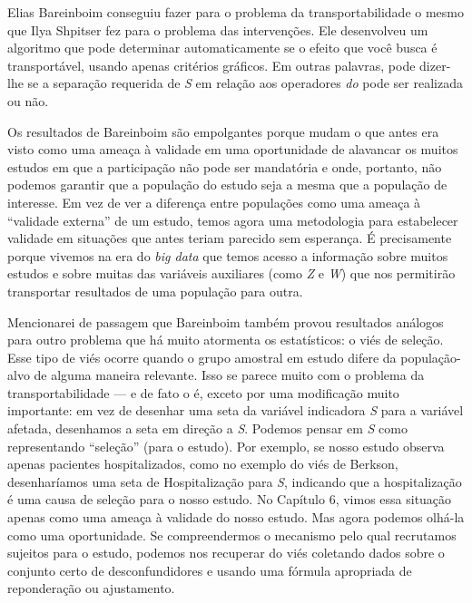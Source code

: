 \documentclass[11pt,a5paper,twoside]{book}
\begin{document}
Elias Bareinboim conseguiu fazer para o problema da transportabilidade o mesmo que Ilya Shpitser fez para o problema das intervenções. Ele desenvolveu um algoritmo que pode determinar automaticamente se o efeito que você busca é transportável, usando apenas critérios gráficos. Em outras palavras, pode dizer-lhe se a separação requerida de \textit{S} em relação aos operadores \textit{do} pode ser realizada ou não.

Os resultados de Bareinboim são empolgantes porque mudam o que antes era visto como uma ameaça à validade em uma oportunidade de alavancar os muitos estudos em que a participação não pode ser mandatória e onde, portanto, não podemos garantir que a população do estudo seja a mesma que a população de interesse. Em vez de ver a diferença entre populações como uma ameaça à “validade externa” de um estudo, temos agora uma metodologia para estabelecer validade em situações que antes teriam parecido sem esperança. É precisamente porque vivemos na era do \textit{big data} que temos acesso a informação sobre muitos estudos e sobre muitas das variáveis auxiliares (como \textit{Z} e \textit{W}) que nos permitirão transportar resultados de uma população para outra.

Mencionarei de passagem que Bareinboim também provou resultados análogos para outro problema que há muito atormenta os estatísticos: o viés de seleção. Esse tipo de viés ocorre quando o grupo amostral em estudo difere da população-alvo de alguma maneira relevante. Isso se parece muito com o problema da transportabilidade — e de fato o é, exceto por uma modificação muito importante: em vez de desenhar uma seta da variável indicadora \textit{S} para a variável afetada, desenhamos a seta em direção a \textit{S}. Podemos pensar em \textit{S} como representando “seleção” (para o estudo). Por exemplo, se nosso estudo observa apenas pacientes hospitalizados, como no exemplo do viés de Berkson, desenharíamos uma seta de Hospitalização para \textit{S}, indicando que a hospitalização é uma causa de seleção para o nosso estudo. No Capítulo 6, vimos essa situação apenas como uma ameaça à validade do nosso estudo. Mas agora podemos olhá-la como uma oportunidade. Se compreendermos o mecanismo pelo qual recrutamos sujeitos para o estudo, podemos nos recuperar do viés coletando dados sobre o conjunto certo de desconfundidores e usando uma fórmula apropriada de reponderação ou ajustamento.
\end{document}
